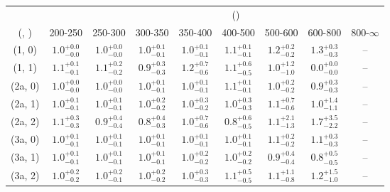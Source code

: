 \begin{table}[h!]
\tiny
\centering
{}
\begin{tabular}
{ccccccccc}
	\hline\hline
&	& \multicolumn{8}{c}{\scalht (\gev)} \\ 
	 (\njet,  \nb) & 200-250 & 250-300 & 300-350 & 350-400 & 400-500 & 500-600 & 600-800 & 800-$\infty$ \\ [0.8ex] 
\hline
	(1, 0) & $1.0^{+ 0.0 }_{- 0.0 }$ & $1.0^{+ 0.0 }_{- 0.0 }$ & $1.0^{+ 0.1 }_{- 0.1 }$ & $1.0^{+ 0.1 }_{- 0.1 }$ & $1.1^{+ 0.1 }_{- 0.1 }$ & $1.2^{+ 0.2 }_{- 0.2 }$ & $1.3^{+ 0.3 }_{- 0.3 }$ & -- \\[0.5ex] 
	(1, 1) & $1.1^{+ 0.1 }_{- 0.1 }$ & $1.1^{+ 0.2 }_{- 0.2 }$ & $0.9^{+ 0.3 }_{- 0.3 }$ & $1.2^{+ 0.7 }_{- 0.6 }$ & $1.1^{+ 0.6 }_{- 0.5 }$ & $1.0^{+ 1.2 }_{- 1.0 }$ & $0.0^{+ 0.0 }_{- 0.0 }$ & -- \\[0.5ex] 
	(2a, 0) & $1.0^{+ 0.0 }_{- 0.0 }$ & $1.0^{+ 0.0 }_{- 0.0 }$ & $1.0^{+ 0.1 }_{- 0.1 }$ & $1.0^{+ 0.1 }_{- 0.1 }$ & $1.1^{+ 0.1 }_{- 0.1 }$ & $1.0^{+ 0.2 }_{- 0.2 }$ & $0.9^{+ 0.3 }_{- 0.3 }$ & -- \\[0.5ex] 
	(2a, 1) & $1.0^{+ 0.1 }_{- 0.1 }$ & $1.0^{+ 0.1 }_{- 0.1 }$ & $1.0^{+ 0.2 }_{- 0.2 }$ & $1.0^{+ 0.3 }_{- 0.2 }$ & $1.0^{+ 0.3 }_{- 0.3 }$ & $1.1^{+ 0.7 }_{- 0.6 }$ & $1.0^{+ 1.4 }_{- 1.1 }$ & -- \\[0.5ex] 
	(2a, 2) & $1.1^{+ 0.3 }_{- 0.3 }$ & $0.9^{+ 0.4 }_{- 0.4 }$ & $0.8^{+ 0.4 }_{- 0.3 }$ & $1.0^{+ 0.7 }_{- 0.6 }$ & $0.8^{+ 0.6 }_{- 0.5 }$ & $1.1^{+ 2.1 }_{- 1.3 }$ & $1.7^{+ 3.5 }_{- 2.2 }$ & -- \\[0.5ex] 
	(3a, 0) & $1.0^{+ 0.1 }_{- 0.1 }$ & $1.0^{+ 0.1 }_{- 0.1 }$ & $1.0^{+ 0.1 }_{- 0.1 }$ & $1.0^{+ 0.1 }_{- 0.1 }$ & $1.0^{+ 0.1 }_{- 0.1 }$ & $1.1^{+ 0.2 }_{- 0.2 }$ & $1.1^{+ 0.3 }_{- 0.3 }$ & -- \\[0.5ex] 
	(3a, 1) & $1.0^{+ 0.1 }_{- 0.1 }$ & $1.0^{+ 0.1 }_{- 0.1 }$ & $1.0^{+ 0.1 }_{- 0.1 }$ & $1.0^{+ 0.2 }_{- 0.2 }$ & $1.0^{+ 0.2 }_{- 0.2 }$ & $0.9^{+ 0.4 }_{- 0.4 }$ & $0.8^{+ 0.5 }_{- 0.5 }$ & -- \\[0.5ex] 
	(3a, 2) & $1.0^{+ 0.2 }_{- 0.2 }$ & $1.0^{+ 0.2 }_{- 0.1 }$ & $1.0^{+ 0.2 }_{- 0.2 }$ & $1.0^{+ 0.3 }_{- 0.3 }$ & $1.1^{+ 0.5 }_{- 0.5 }$ & $1.1^{+ 1.1 }_{- 0.8 }$ & $1.2^{+ 1.5 }_{- 1.0 }$ & -- \\[0.5ex] 

\end{tabular}
\end{table}
